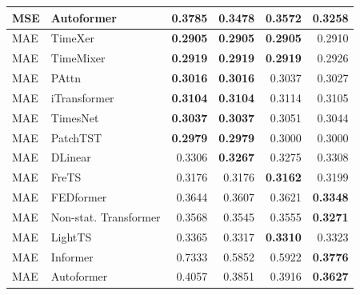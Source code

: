\begin{longtable}{llrrrr}
MSE & Autoformer & 0.3785 & 0.3478 & 0.3572 & \textbf{0.3258} \\
\midrule
MAE & TimeXer & \textbf{0.2905} & \textbf{0.2905} & \textbf{0.2905} & 0.2910 \\
MAE & TimeMixer & \textbf{0.2919} & \textbf{0.2919} & \textbf{0.2919} & 0.2926 \\
MAE & PAttn & \textbf{0.3016} & \textbf{0.3016} & 0.3037 & 0.3027 \\
MAE & iTransformer & \textbf{0.3104} & \textbf{0.3104} & 0.3114 & 0.3105 \\
MAE & TimesNet & \textbf{0.3037} & \textbf{0.3037} & 0.3051 & 0.3044 \\
MAE & PatchTST & \textbf{0.2979} & \textbf{0.2979} & 0.3000 & 0.3000 \\
MAE & DLinear & 0.3306 & \textbf{0.3267} & 0.3275 & 0.3308 \\
MAE & FreTS & 0.3176 & 0.3176 & \textbf{0.3162} & 0.3199 \\
MAE & FEDformer & 0.3644 & 0.3607 & 0.3621 & \textbf{0.3348} \\
MAE & Non-stat. Transformer & 0.3568 & 0.3545 & 0.3555 & \textbf{0.3271} \\
MAE & LightTS & 0.3365 & 0.3317 & \textbf{0.3310} & 0.3323 \\
MAE & Informer & 0.7333 & 0.5852 & 0.5922 & \textbf{0.3776} \\
MAE & Autoformer & 0.4057 & 0.3851 & 0.3916 & \textbf{0.3627} \\
\end{longtable}
\endgroup

